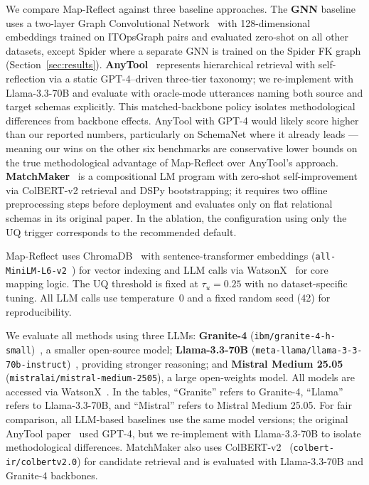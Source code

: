 \documentclass[sigconf, nonacm]{acmart}
\begin{document}
We compare Map-Reflect against three baseline approaches. The \textbf{GNN} baseline uses a two-layer Graph Convolutional Network~\cite{kipf2017gcn} with 128-dimensional embeddings trained on ITOpsGraph pairs and evaluated zero-shot on all other datasets, except Spider where a separate GNN is trained on the Spider FK graph (Section~\ref{sec:results}). \textbf{AnyTool}~\cite{anytool} represents hierarchical retrieval with self-reflection via a static GPT-4--driven three-tier taxonomy; we re-implement with Llama-3.3-70B and evaluate with oracle-mode utterances naming both source and target schemas explicitly. This matched-backbone policy isolates methodological differences from backbone effects. AnyTool with GPT-4 would likely score higher than our reported numbers, particularly on SchemaNet where it already leads — meaning our wins on the other six benchmarks are conservative lower bounds on the true methodological advantage of Map-Reflect over AnyTool's approach. \textbf{MatchMaker}~\cite{matchmaker} is a compositional LM program with zero-shot self-improvement via ColBERT-v2 retrieval and DSPy bootstrapping; it requires two offline preprocessing steps before deployment and evaluates only on flat relational schemas in its original paper. In the ablation, the configuration using only the UQ trigger corresponds to the recommended default.

Map-Reflect uses ChromaDB~\cite{chromadb2023} with sentence-transformer embeddings (\texttt{all-MiniLM-L6-v2}~\cite{reimers2019sentence}) for vector indexing and LLM calls via WatsonX~\cite{ibm2023watsonx} for core mapping logic. The UQ threshold is fixed at $\tau_u = 0.25$ with no dataset-specific tuning. All LLM calls use temperature~0 and a fixed random seed (42) for reproducibility.

We evaluate all methods using three LLMs: \textbf{Granite-4}
(\texttt{ibm/granite-4-h-small})~\cite{granite2025}, a smaller open-source model;
\textbf{Llama-3.3-70B} (\texttt{meta-llama/llama-3-3-70b-instruct})~\cite{grattafiori2024llama3},
providing stronger reasoning; and \textbf{Mistral Medium 25.05}
(\texttt{mistralai/mistral-medium-2505}), a large open-weights model.
All models are accessed via WatsonX~\cite{ibm2023watsonx}.
In the tables, ``Granite'' refers to Granite-4, ``Llama'' refers to Llama-3.3-70B,
and ``Mistral'' refers to Mistral Medium 25.05.
For fair comparison, all LLM-based baselines use the same model versions; the original AnyTool paper~\cite{anytool} used GPT-4, but we re-implement with Llama-3.3-70B to isolate methodological differences. MatchMaker also uses ColBERT-v2~\cite{colbert} (\texttt{colbert-ir/colbertv2.0}) for candidate retrieval and is evaluated with Llama-3.3-70B and Granite-4 backbones.
\end{document}
